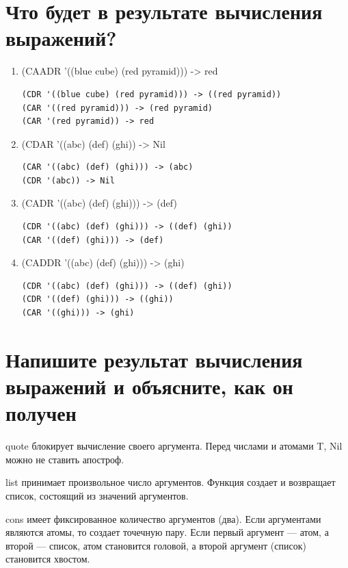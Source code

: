 \documentclass[12pt]{report}
\begin{document}
\section{Что будет в результате вычисления выражений?}

\begin{enumerate}
    \item (CAADR '((blue cube) (red pyramid))) -> red

        \begin{lstlisting}[language=Lisp]
(CDR '((blue cube) (red pyramid))) -> ((red pyramid))
(CAR '((red pyramid))) -> (red pyramid)
(CAR '(red pyramid)) -> red
        \end{lstlisting}

    \item (CDAR '((abc) (def) (ghi)) -> Nil

        \begin{lstlisting}[language=Lisp]
(CAR '((abc) (def) (ghi))) -> (abc)
(CDR '(abc)) -> Nil
        \end{lstlisting}

    \item (CADR '((abc) (def) (ghi))) -> (def)

        \begin{lstlisting}[language=Lisp]
(CDR '((abc) (def) (ghi))) -> ((def) (ghi))
(CAR '((def) (ghi))) -> (def)
        \end{lstlisting}

    \item (CADDR '((abc) (def) (ghi))) -> (ghi)

        \begin{lstlisting}[language=Lisp]
(CDR '((abc) (def) (ghi))) -> ((def) (ghi))
(CDR '((def) (ghi))) -> ((ghi))
(CAR '((ghi))) -> (ghi)
        \end{lstlisting}
\end{enumerate}


\section{Напишите результат вычисления выражений и объясните, как он получен}

quote блокирует вычисление своего аргумента. Перед  числами и атомами T, Nil можно не ставить апостроф. 

list принимает произвольное число аргументов. Функция создает и возвращает список, состоящий из значений аргументов.

cons имеет фиксированное количество аргументов (два). Если аргументами являются атомы, то создает точечную пару. Если первый аргумент --- атом, а второй --- список, атом становится головой, а второй аргумент (список) становится хвостом. 
\end{document}
